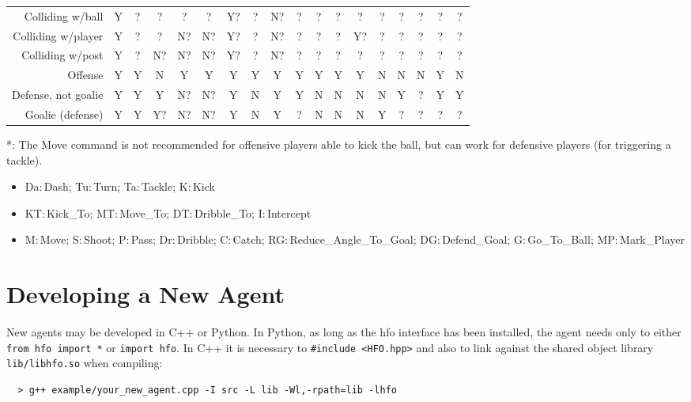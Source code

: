 \documentclass[12pt]{article}
\begin{document}
\begin{center}
{\begin{tabular}{r       | c    c      c    c   | c     c      c    c  | c    c    c     c     c     c     c     c     c}
Colliding w/ball        & Y  &  ?  &  ?  &  ?  & ?  &  Y? &  ?  &  N? & ?  & ?  & ?  &  ?   & ?  &  ?  &  ?   & ?  &  ? \\
Colliding w/player      & Y  &  ?  &  ?  &  N? & N? &  Y? &  ?  &  N? & ?  & ?  & ?  &  Y?  & ?  &  ?  &  ?   & ?  &  ? \\
Colliding w/post        & Y  &  ?  &  N? &  N? & N? &  Y? &  ?  &  N? & ?  & ?  & ?  &  ?   & ?  &  ?  &  ?   & ?  &  ? \\
\hline
Offense                 & Y  &  Y  &  N  &  Y  & Y  &  Y  &  Y  &  Y  & Y  & Y  & Y  &  Y   & N  &  N  &  N   & Y  &  N \\
Defense, not goalie     & Y  &  Y  &  Y  &  N? & N? &  Y  &  N  &  Y  & Y  & N  & N  &  N   & N  &  Y  &  ?   & Y  &  Y \\
Goalie (defense)        & Y  &  Y  &  Y? &  N? & N? &  Y  &  N  &  Y  & ?  & N  & N  &  N   & Y  &  ?  &  ?   & ?  &  ? \\
\end{tabular}
}
\end{center}
*: The Move command is not recommended for offensive players able to kick the ball, but can work for defensive players (for triggering a tackle).\\
\begin{itemize}[noitemsep]
\item{Da:\,Dash; Tu:\,Turn; Ta:\,Tackle; K:\,Kick}
\item{KT:\,Kick\_To; MT:\,Move\_To; DT:\,Dribble\_To; I:\,Intercept}
\item{M:\,Move; S:\,Shoot; P:\,Pass; Dr:\,Dribble; C:\,Catch; RG:\,Reduce\_Angle\_To\_Goal; DG:\,Defend\_Goal; G:\,Go\_To\_Ball; MP:\,Mark\_Player}
\end{itemize}

\section{Developing a New Agent}

New agents may be developed in C++ or Python. In Python, as long as
the hfo interface has been installed, the agent needs only to
either \verb+from hfo import *+ or \verb+import hfo+. In C++ it is necessary to
\verb+#include <HFO.hpp>+ and also to link against the shared object
library \verb+lib/libhfo.so+ when compiling:

\begin{verbatim}
  > g++ example/your_new_agent.cpp -I src -L lib -Wl,-rpath=lib -lhfo
\end{verbatim}



\end{document}
